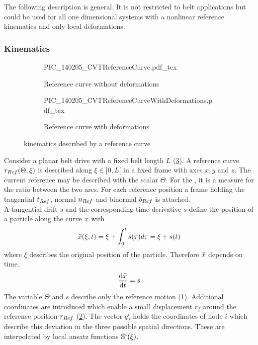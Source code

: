 The following description is general.
It is not restricted to \CVT belt applications but could be used for all one dimensional systems with a nonlinear reference kinematics and only local deformations.
%
\subsubsection{Kinematics} \label{subsubsec:Kinematics}
%
\begin{figure}
  \centering
    \begin{subfigure}{0.48\textwidth}
      {PIC_140205_CVTReferenceCurve.pdf_tex}
      \caption{Reference curve without deformations}
      \label{fig:PIC_140205_CVTReferenceCurveWithoutDeformation}
    \end{subfigure}
    \hfill{}
    \begin{subfigure}{0.48\textwidth}
      {PIC_140205_CVTReferenceCurveWithDeformations.pdf_tex}
      \caption{Reference curve with deformations}
      \label{fig:PIC_140205_CVTReferenceCurveWithDeformations}
    \end{subfigure}
    \caption[CVT kinematics described by a reference curve]{\CVT kinematics described by a reference curve}
    \label{fig:PIC_140205_CVTReferenceCurve}
\end{figure}
%
Consider a planar belt drive with a fixed belt length $L$ (\cref{fig:PIC_140205_CVTReferenceCurve}).
A reference curve $r _{Ref} (\Theta, \xi)$ is described along $\xi \in [0, L[$ in a fixed frame with axes $x,y$ and $z$.
The current reference may be described with the scalar $\Theta$.
For the \CVT, it is a measure for the ratio between the two arcs.
For each reference position a frame holding the tangential $t _{Ref}$, normal $n _{Ref}$ and binormal $b _{Ref}$ is attached.\\
A tangential drift $s$ and the corresponding time derivative $\dot{s}$ define the position of a particle along the curve $\bar{x}$ with
%
\begin{align}
  \bar{x}(\xi,t) = \xi + \int _{0} ^{t} \dot{s}(\tau) d\tau = \xi + s(t)
\end{align}
%
where $\xi$ describes the original position of the particle.
Therefore $\bar{x}$ depends on time.
%
\begin{align*}
  \frac{\mathrm{d} \bar{x}}{\mathrm{d} t} = \dot{s}
\end{align*}
%
The variable $\Theta$ and $s$ describe only the reference motion (\cref{fig:PIC_140205_CVTReferenceCurveWithoutDeformation}).
Additional coordinates are introduced which enable a small displacement $r_f$ around the reference position $r _{Ref}$ (\cref{fig:PIC_140205_CVTReferenceCurveWithDeformations}).
The vector $q _{f} ^{i}$ holds the coordinates of node $i$ which describe this deviation in the three possible spatial directions.
These \dofs are interpolated by local ansatz functions $\mathbb{S}^i(\xi)$.\par
%
